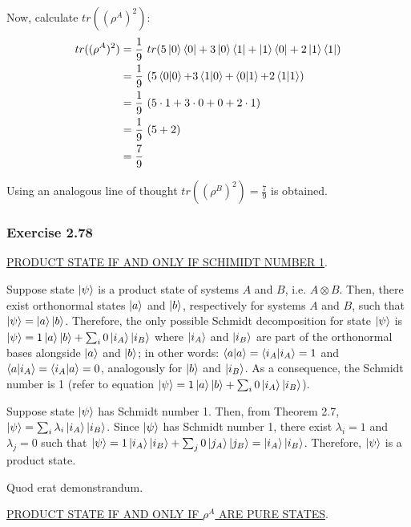 Now, calculate $tr((\rho^A)^2)$:
\begin{align}
    tr((\rho^A)^2) &= \frac{1}{9}\ tr(5\ket{0}\bra{0} + 3\ket{0}\bra{1} +
        \ket{1}\bra{0} + 2\ket{1}\bra{1}) \\
    &= \frac{1}{9}\ (5\mathop{\mathinner{ \langle{0}|{0}\rangle}} + 3\mathop{\mathinner{ \langle{1}|{0}\rangle}} +
        \mathop{\mathinner{ \langle{0}|{1}\rangle}} + 2\mathop{\mathinner{ \langle{1}|{1}\rangle}}) \\
    &= \frac{1}{9}\ (5 \cdot 1 + 3 \cdot 0 + 0 + 2 \cdot 1) \\
    &= \frac{1}{9}\ (5 + 2) \\
    &= \frac{7}{9}
\end{align}

Using an analogous line of thought $tr((\rho^B)^2) = \frac{7}{9}$ is obtained.


\subsubsection{Exercise 2.78}
\MakeUppercase{\underline{Product State if and only if Schimidt number 1}}.

Suppose state $\ket{\psi}$ is a product state of systems
$A$ and $B$, i.e. $A \otimes B$.
Then, there exist orthonormal states $\ket{a}$ and $\ket{b}$,
respectively for systems $A$ and $B$, such that
$\ket{\psi} = \ket{a} \ket{b}$.
Therefore, the only possible Schmidt decomposition for state $\ket{\psi}$ is
$\ket{\psi} = 1 \ket{a} \ket{b} + \sum_i 0 \ket{i_A} \ket{i_B}$ where
$\ket{i_A}$ and $\ket{i_B}$ are part of the orthonormal bases alongside
$\ket{a}$ and $\ket{b}$; in other words:
$\mathop{\mathinner{ \langle{a}|{a}\rangle}} = \mathop{\mathinner{ \langle{i_A}|{i_A}\rangle}} = 1$ and
$\mathop{\mathinner{ \langle{a}|{i_A}\rangle}} = \mathop{\mathinner{ \langle{i_A}|{a}\rangle}} = 0$,
analogously for $\ket{b}$ and $\ket{i_B}$.
As a consequence, the Schmidt number is 1
(refer to equation
$\ket{\psi} = 1 \ket{a} \ket{b} + \sum_i 0 \ket{i_A} \ket{i_B}$).

Suppose state $\ket{\psi}$ has Schmidt number 1.
Then, from Theorem 2.7,
$\ket{\psi} = \sum_i \lambda_i \ket{i_A} \ket{i_B}$.
Since $\ket{\psi}$ has Schmidt number 1,
there exist $\lambda_i = 1$ and $\lambda_j = 0$ such that
$\ket{\psi} = 1 \ket{i_A} \ket{i_B} + \sum_j 0 \ket{j_A} \ket{j_B}
= \ket{i_A} \ket{i_B}$.
Therefore, $\ket{\psi}$ is a product state.

Quod erat demonstrandum.

\MakeUppercase{\underline{Product State if and only if $\rho^A$ are pure states}}.

